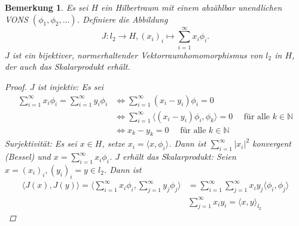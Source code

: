 \documentclass[12pt,titlepage]{article}
\newtheorem{bemerkung}[zahl]{Bemerkung}
\numberwithin{equation}{section}
\begin{document}
\begin{bemerkung}
Es sei $H$ ein Hilbertraum mit einem abzählbar unendlichen VONS $(\phi_1,\phi_2,\ldots)$. Definiere die Abbildung
\[
J:l_2 \to H, (x_i)_i \mapsto \sum_{i=1}^{\infty} x_i\phi_i.
\]
$J$ ist ein bijektiver, normerhaltender Vektorraumhomomorphismus von $l_2$ in $H$, der auch das Skalarprodukt erhält.
\begin{proof}
$J$ ist injektiv: Es sei 
\begin{align*}
\sum_{i=1}^{\infty} x_i \phi_i=\sum_{i=1}^{\infty} y_i \phi_i &\Leftrightarrow \sum_{i=1}^{\infty} (x_i-y_i) \phi_i=0\\
&\Leftrightarrow \sum_{i=1}^{\infty} \langle (x_i-y_i) \phi_i ,\phi_k\rangle =0\quad \text{ für alle }k\in \mathbb{N}\\
&\Leftrightarrow x_k-y_k=0 \quad \text{ für alle }k\in \mathbb{N}
\end{align*}
Surjektivität: Es sei $x\in H$, setze $x_i=\langle x,\phi_i\rangle$. Dann ist $\sum_{i=1}^{\infty} \vert x_i\vert^2$ konvergent (Bessel) und $x=\sum_{i=1}^{\infty}x_i \phi_i$. $J$ erhält das Skalarprodukt: Seien $x=(x_i)_i,(y_i)_i=y\in l_2$. Dann ist 
\begin{align*}
\langle J(x),J(y) \rangle=\langle \sum_{i=1}^{\infty}x_i \phi_i,\sum_{j=1}^{\infty}y_j \phi_j \rangle&=\sum_{i=1}^{\infty}\sum_{j=1}^{\infty} x_i y_j\langle \phi_i,\phi_j \rangle\\
&\sum_{j=1}^{\infty}x_iy_i=\langle x,y\rangle_{l_2}
\end{align*}
\end{proof}
\end{bemerkung}
\end{document}
